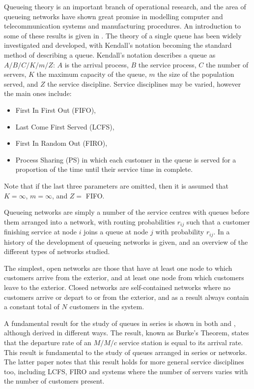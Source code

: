 \documentclass{article}
\begin{document}
Queueing theory is an important branch of operational research, and the area of queueing networks have shown great promise in modelling computer and telecommunication systems and manufacturing procedures.
An introduction to some of these results is given in \cite{stewart09}.
The theory of a single queue has been widely investigated and developed, with Kendall's notation becoming the standard method of describing a queue.
Kendall's notation describes a queue as $A/B/C/K/m/Z$: $A$ is the arrival process, $B$ the service process, $C$ the number of servers, $K$ the maximum capacity of the queue, $m$ the size of the population served, and $Z$ the service discipline.
Service disciplines may be varied, however the main ones include:

\begin{itemize}
    \item First In First Out (FIFO),
    \item Last Come First Served (LCFS),
    \item First In Random Out (FIRO),
    \item Process Sharing (PS) in which each customer in the queue is served for a proportion of the time until their service time in complete.
\end{itemize}
Note that if the last three parameters are omitted, then it is assumed that $K = \infty$, $m = \infty$, and $Z =$ FIFO.

Queueing networks are simply a number of the service centres with queues before
them arranged into a network, with routing probabilities $r_{ij}$ such that a
customer finishing service at node $i$ joins a queue at node $j$ with
probability $r_{ij}$. %
In \cite{rege90} a history of the development of queueing networks is given, and an overview of the different types of networks studied.

The simplest, open networks are those that have at least one node to which
customers arrive from the exterior, and at least one node from which customers leave to the exterior.
Closed networks are self-contained networks where no customers arrive or depart to or from the exterior, and as a result always contain a constant total of $N$ customers in the system.

A fundamental result for the study of queues in series is shown in both \cite{burke56} and \cite{reich57}, although derived in different ways.
The result, known as Burke's Theorem, states that the departure rate of an $M/M/c$ service station is equal to its arrival rate.
This result is fundamental to the study of queues arranged in series or networks.
The latter paper notes that this result holds for more general service disciplines too, including LCFS, FIRO and systems where the number of servers varies with the number of customers present.
\end{document}
